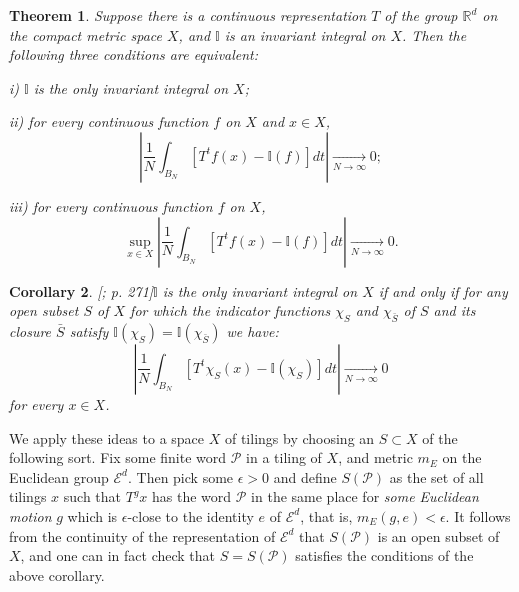 \documentclass[reqno]{stml-l}
\theoremstyle{plain}
\newtheorem{theorem}{Theorem}[chapter]
\newtheorem{corollary}[theorem]{Corollary}
\theoremstyle{definition}
\numberwithin{equation}{chapter}
\begin{document}
\begin{theorem}\label{ch04:thm4.2}
Suppose there is a continuous representation $T$ of the group $\mathbb{R}^{d}$ on the compact metric space $X$, and $\mathbb{I}$ is an invariant integral on $X$. Then the following three conditions are equivalent:

i) $\mathbb{I}$ is the only invariant integral on $X$;

ii) for every continuous function $f$ on $X$ and $x\in X$,
\begin{equation}\label{ch04:eqn4.5}
|\frac{1}{N}\int_{B_{N}}[T^{t}f(x)-\mathbb{I}(f)]dt|\mathop{\longrightarrow}\limits_{N\rightarrow\infty}0;
\end{equation}

iii) for every continuous function $f$ on $X$,
\begin{equation}\label{ch04:eqn4.6}
\sup\limits_{x\in X}|\frac{1}{N}\int_{B_{N}}[T^{t}f(x)-\mathbb{I}(f)]dt|\mathop{\longrightarrow}\limits_{N\rightarrow\infty}0.
\end{equation}
\end{theorem}

\begin{corollary}\emph{[; p. 271]}\label{ch04:cor4.3}
$\mathbb{I}$ is the only invariant integral on $X$ if and only if for any open subset $S$ of $X$ for which the indicator functions $\chi_{S}$ and $\chi_{\bar{S}}$ of $S$ and its closure $\bar{S}$ satisfy $\mathbb{I}(\chi_{S})=\mathbb{I}(\chi_{\bar{S}})$ we have:
\begin{equation}\label{ch04:eqn4.7}
|\frac{1}{N}\int_{B_{N}}[T^{t}\chi_{S}(x)-\mathbb{I}(\chi_{S})]dt|\mathop{\longrightarrow}\limits_{N\rightarrow\infty}0
\end{equation}
for every $x\in X$.
\end{corollary}

We apply these ideas to a space $X$ of tilings by choosing an $S\subset X$ of the following sort. Fix some finite word $\mathcal{P}$ in a tiling of $X$, and metric $m_{E}$ on the Euclidean group $\mathcal{E}^{d}$. Then pick some $\epsilon>0$ and define $S(\mathcal{P})$ as the set of all tilings $x$ such that $T^{g}x$ has the word $\mathcal{P}$ in the same place for \emph{some Euclidean motion} $g$ which is $\epsilon$-close to the identity $e$ of $\mathcal{E}^{d}$, that is, $m_{E}(g, e)<\epsilon$. It follows from the continuity of the representation of $\mathcal{E}^{d}$ that $S(\mathcal{P})$ is an open subset of $X$, and one can in fact check that $S=S(\mathcal{P})$ satisfies the conditions of the above corollary.
\end{document}
